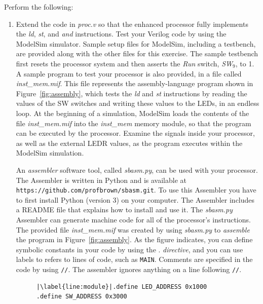 \documentclass[epsfig,10pt,fullpage]{article}
\begin{document}
\newpage
\noindent
Perform the following:
\begin{enumerate}
\item Extend the code in {\it proc.v} so that the enhanced processor fully implements the 
{\it ld}, {\it st}, and {\it and} instructions. Test your Verilog code by using the ModelSim
simulator. Sample setup files for ModelSim, including a testbench, are provided along with 
the other files for this exercise.  The sample testbench first resets the processor system
and then asserts the {\it Run} switch, {\it SW}$_9$, to 1. A sample program to test your 
processor is also provided, in a file called {\it inst\_mem.mif}. This file represents the 
assembly-language program shown in Figure~\ref{fig:assembly}, which tests 
the {\it ld} and {\it st} instructions by reading the values of the SW switches and writing 
these values to the LEDs, in an endless loop. At the beginning of a simulation, ModelSim loads 
the contents of the file {\it inst\_mem.mif} into the {\it inst\_mem} memory module, so
that the program can be executed by the processor.  Examine the signals inside 
your processor, as well as the external LEDR values, as the program executes within the
ModelSim simulation.

An {\it assembler} software tool, called {\it sbasm.py}, can be used with your processor.
The Assembler is written in Python and is available at
\texttt{https://github.com/profbrown/sbasm.git}. To use this 
Assembler you have to first install Python (version 3) on your computer. The Assembler includes
a README file that explains how to install and use it. The {\it sbasm.py} Assembler can 
generate machine code for all of the processor's instructions. The provided file 
{\it inst\_mem.mif} was created by using {\it sbasm.py} to {\it assemble} the program in 
Figure~\ref{fig:assembly}. As the figure indicates, you can define symbolic
constants in your code by using the . {\it directive}, and you can use 
labels to refers to lines of code, such as \texttt{MAIN}.
Comments are specified in the code by using \texttt{//}. The assembler ignores anything 
on a line following \texttt{//}.

\lstset{language=ASM,numbers=none,escapechar=|}
\begin{figure}[H]
\begin{center}
\begin{minipage}[h]{12.5 cm}
\begin{lstlisting}[name=proc]
|\label{line:module}|.define LED_ADDRESS 0x1000
.define SW_ADDRESS 0x3000


\end{lstlisting}
\end{minipage}
\end{center}
\end{figure}
\end{enumerate}
\end{document}

